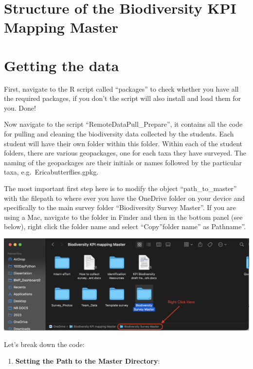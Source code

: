 \documentclass[
]{book}
\providecommand{\tightlist}{%
  \setlength{\itemsep}{0pt}\setlength{\parskip}{0pt}}
\theoremstyle{definition}
\theoremstyle{definition}
\theoremstyle{definition}
\theoremstyle{definition}
\theoremstyle{remark}
\begin{document}
\hypertarget{structure-of-the-biodiversity-kpi-mapping-master}{%
\section{Structure of the Biodiversity KPI Mapping Master}\label{structure-of-the-biodiversity-kpi-mapping-master}}

\hypertarget{getting-the-data}{%
\section{Getting the data}\label{getting-the-data}}

First, navigate to the R script called ``packages'' to check whether you have all the required packages, if you don't the script will also install and load them for you. Done!

Now navigate to the script ``RemoteDataPull\_Prepare'', it contains all the code for pulling and cleaning the biodiversity data collected by the students. Each student will have their own folder within this folder. Within each of the student folders, there are various geopackages, one for each taxa they have surveyed. The naming of the geopackages are their initials or names followed by the particular taxa, e.g.~Ericabutterflies.gpkg.

The most important first step here is to modify the object ``path\_to\_master'' with the filepath to where ever you have the OneDrive folder on your device and specifically to the main survey folder ``Biodiversity Survey Master''. If you are using a Mac, navigate to the folder in Finder and then in the bottom panel (see below), right click the folder name and select ``Copy''folder name'' as Pathname''.

\includegraphics{images/pathname_copy.png}

Let's break down the code:

\begin{enumerate}
\def\labelenumi{\arabic{enumi}.}
\tightlist
\item
  \textbf{Setting the Path to the Master Directory}:
\end{enumerate}
\end{document}
